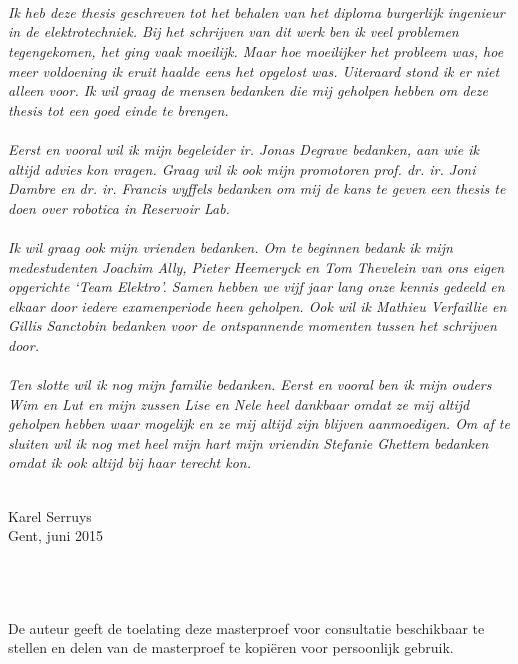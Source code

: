 \newpage
\thispagestyle{empty}
\\
\\
\\
\textit{Ik heb deze thesis geschreven tot het behalen van het diploma burgerlijk ingenieur in de elektrotechniek. Bij het schrijven van dit werk ben ik veel problemen tegengekomen, het ging vaak moeilijk. Maar hoe moeilijker het probleem was, hoe meer voldoening ik eruit haalde eens het opgelost was. Uiteraard stond ik er niet alleen voor. Ik wil graag de mensen bedanken die mij geholpen hebben om deze thesis tot een goed einde te brengen.\\
\\	
Eerst en vooral wil ik mijn begeleider ir. Jonas Degrave bedanken, aan wie ik altijd advies kon vragen. Graag wil ik ook mijn promotoren prof. dr. ir. Joni Dambre en dr. ir. {Francis} {wyffels} bedanken om mij de kans te geven een thesis te doen over robotica in Reservoir Lab.\\
\\
Ik wil graag ook mijn vrienden bedanken. Om te beginnen bedank ik mijn medestudenten Joachim Ally, Pieter Heemeryck en Tom Thevelein van ons eigen opgerichte `Team Elektro'. Samen hebben we vijf jaar lang onze kennis gedeeld en elkaar door iedere examenperiode heen geholpen. Ook wil ik Mathieu Verfaillie en Gillis Sanctobin bedanken voor de ontspannende momenten tussen het schrijven door.\\
\\
Ten slotte wil ik nog mijn familie bedanken. Eerst en vooral ben ik mijn ouders Wim en Lut en mijn zussen Lise en Nele heel dankbaar omdat ze mij altijd geholpen hebben waar mogelijk en ze mij altijd zijn blijven aanmoedigen. Om af te sluiten wil ik nog met heel mijn hart mijn vriendin Stefanie Ghettem bedanken omdat ik ook altijd bij haar terecht kon.}\\
\\
\begin{flushright}
	Karel Serruys\\
	Gent, juni 2015
\end{flushright}

\newpage
\thispagestyle{empty}
\\
\\
\\
De auteur geeft de toelating deze masterproef voor consultatie beschikbaar te stellen en delen van de masterproef te kopi\"eren voor persoonlijk gebruik.

